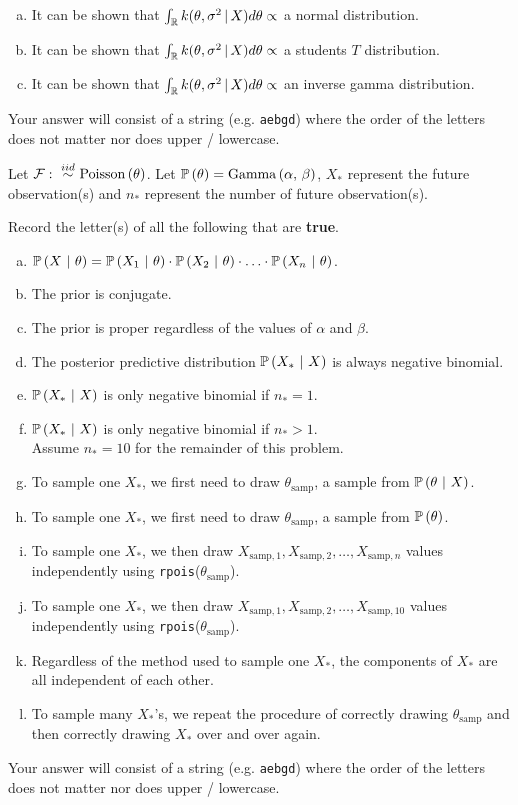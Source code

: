 \documentclass[12pt]{article}
\newcommand{\instr}{\scriptsize Your answer will consist of a string (e.g. \texttt{aebgd}) where the order of the letters does not matter nor does upper / lowercase. \normalsize}
\newcommand{\recordletters}{\small Record the letter(s) of all the following that are \textbf{true}. \normalsize}
\begin{document}
\begin{enumerate}[(a)]
\item It can be shown that $\int_{\mathbb{R}} k(\theta, \sigma^2\,|\,X) d\theta \propto$ a normal distribution.
\item It can be shown that $\int_{\mathbb{R}} k(\theta, \sigma^2\,|\,X) d\theta \propto$ a students $T$ distribution.
\item It can be shown that $\int_{\mathbb{R}} k(\theta, \sigma^2\,|\,X) d\theta \propto$ an inverse gamma distribution.
\end{enumerate}\eenum\instr\pagebreak




\problem [7min] Let $\mathcal{F}: \iid \poisson{\theta}$. Let $\mathbb{P}\left(\theta\right) = \mathrm{Gamma}\left(\alpha,\,\beta\right)$,  $X_*$ represent the future observation(s) and $n_*$ represent the number of future observation(s).

\benum{} \recordletters

\begin{enumerate}[(a)]
\item $\mathbb{P}\left(X~|~\theta\right) = \mathbb{P}\left(X_1~|~\theta\right) \cdot \mathbb{P}\left(X_2~|~\theta\right) \cdot \ldots \cdot  \mathbb{P}\left(X_n~|~\theta\right)$.
\item The prior is conjugate.
\item The prior is proper regardless of the values of $\alpha$ and $\beta$.
\item The posterior predictive distribution $\mathbb{P}\left(X_*~|~X\right)$ is always negative binomial.
\item $\mathbb{P}\left(X_*~|~X\right)$ is only negative binomial if $n_* = 1$.
\item $\mathbb{P}\left(X_*~|~X\right)$ is only negative binomial if $n_* > 1$.\\

Assume $n_* = 10$ for the remainder of this problem.

\item To sample one $X_*$, we first need to draw $\theta_{\text{samp}}$, a sample from $\mathbb{P}\left(\theta~|~X\right)$.
\item To sample one $X_*$, we first need to draw $\theta_{\text{samp}}$, a sample from $\mathbb{P}\left(\theta\right)$.
\item To sample one $X_*$, we then draw $X_{\text{samp}, 1}, X_{\text{samp}, 2}, \ldots, X_{\text{samp}, n}$ values independently using \texttt{rpois}($\theta_{\text{samp}}$).
\item To sample one $X_*$, we then draw $X_{\text{samp}, 1}, X_{\text{samp}, 2}, \ldots, X_{\text{samp}, 10}$ values independently using \texttt{rpois}($\theta_{\text{samp}}$).
\item Regardless of the method used to sample one $X_*$, the components of $X_*$ are all independent of each other.
\item To sample many $X_*$'s, we repeat the procedure of correctly drawing $\theta_{\text{samp}}$ and then correctly drawing $X_*$ over and over again.
\end{enumerate}\eenum\instr\pagebreak
\end{document}

